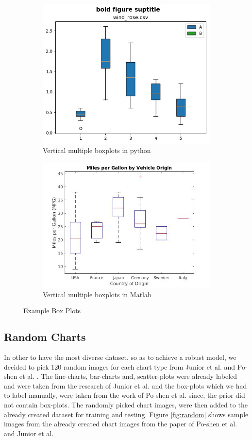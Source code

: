 \documentclass[12pt, a4paper,oneside]{report}
\begin{document}
\begin{figure}[!htbp]
	\begin{subfigure}{.5\textwidth}
		\centering
		\includegraphics[width=.8\linewidth]{box1}
		\caption{Vertical multiple boxplots in python}
		\label{fig:box1}
	\end{subfigure}%
	\begin{subfigure}{.5\textwidth}
		\centering
		\includegraphics[width=.8\linewidth]{box2}
		\caption{Vertical multiple boxplots in Matlab}
		\label{fig:box2}
	\end{subfigure}
	\caption{Example Box Plots}
	\label{fig:figbox}
\end{figure}


\subsection{Random Charts}
In other to have the most diverse dataset, so as to achieve a robust model, we decided to pick 120 random images for each chart type  from Junior et al. \cite{junior2017archi} and Po-shen et al. \cite{lee2016viziometrix}. The line-charts, bar-charts and, scatter-plots were already labeled and were taken from the research of Junior et al. and the box-plots which we had to label manually, were taken from the work of Po-shen et al. since, the prior did not contain box-plots. The randomly picked chart images, were then added to the already created dataset for training and testing. Figure \ref{fig:random} shows sample images from the already created chart images from the paper of Po-shen et al. and Junior et al.
\end{document}
